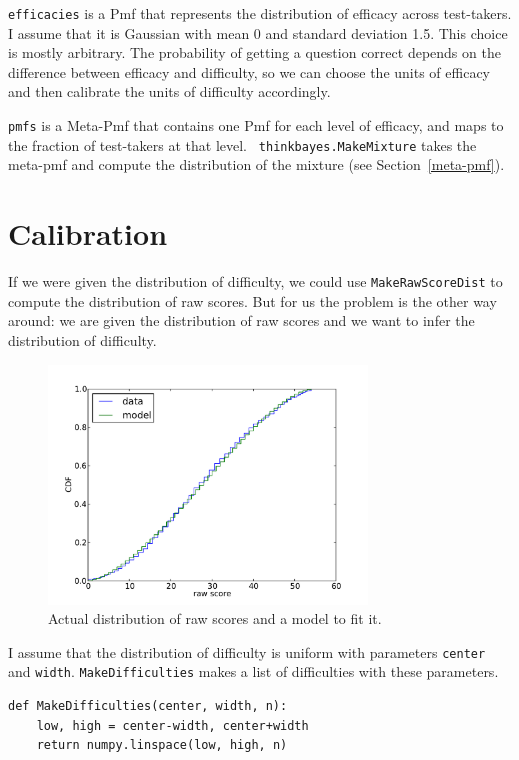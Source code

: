 \documentclass[12pt]{book}
\begin{document}
{\tt efficacies} is a Pmf that represents the distribution of efficacy
across test-takers.  I assume that it is Gaussian with mean 0 and
standard deviation 1.5.  This choice is mostly arbitrary.  The
probability of getting a question correct depends on the difference
between efficacy and difficulty, so we can choose the units of
efficacy and then calibrate the units of difficulty accordingly.

{\tt pmfs} is a Meta-Pmf that contains one Pmf for each level of
efficacy, and maps to the fraction of test-takers at that level.  {\tt
  thinkbayes.MakeMixture} takes the meta-pmf and compute the
distribution of the mixture (see Section~\ref{meta-pmf}).


\section{Calibration}

If we were given the distribution of difficulty, we could use
\verb"MakeRawScoreDist" to compute the distribution of raw scores.
But for us the problem is the other way around: we are given the
distribution of raw scores and we want to infer the distribution of
difficulty.

\begin{figure}
\centerline{\includegraphics[height=2.5in]{figs/sat_calibrate.pdf}}
\caption{Actual distribution of raw scores and a model to fit it.}
\label{fig.satcalibrate}
\end{figure}

I assume that the distribution of difficulty is uniform with
parameters {\tt center} and {\tt width}.  {\tt MakeDifficulties}
makes a list of difficulties with these parameters.

\begin{verbatim}
def MakeDifficulties(center, width, n):
    low, high = center-width, center+width
    return numpy.linspace(low, high, n)
\end{verbatim}
\end{document}
